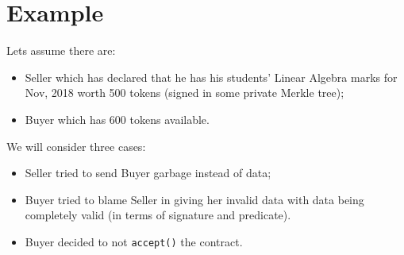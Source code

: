 \documentclass[a4paper]{article}
\begin{document}
\section*{Example}

Lets assume there are:
\begin{itemize}
  \item Seller which has declared that he has his students' Linear Algebra marks for Nov, 2018 worth 500 tokens (signed in some private Merkle tree);
  \item Buyer which has 600 tokens available.
\end{itemize}

We will consider three cases:
\begin{itemize}
  \item Seller tried to send Buyer garbage instead of data;
  \item Buyer tried to blame Seller in giving her invalid data with data being completely valid (in terms of signature and predicate).
  \item Buyer decided to not \verb|accept()| the contract.
\end{itemize}
\end{document}
